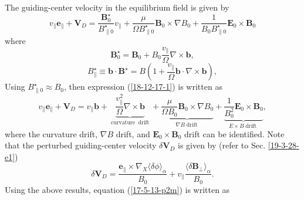 \documentclass{article}
\newcommand{\tmop}[1]{\ensuremath{\operatorname{#1}}}
\begin{document}
The guiding-center velocity in the equilibrium field is given by
\begin{equation}
  \label{18-12-17-1} v_{\parallel} \mathbf{e}_{\parallel} +\mathbf{V}_D =
  \frac{\mathbf{B}^{\star}_0}{B^{\star}_{\parallel 0}} v_{\parallel} +
  \frac{\mu}{\Omega B^{\star}_{\parallel 0}} \mathbf{B}_0 \times \nabla B_0 +
  \frac{1}{B_0 B^{\star}_{\parallel 0}} \mathbf{E}_0 \times \mathbf{B}_0
\end{equation}
where
\begin{equation}
  \mathbf{B}^{\star}_0 =\mathbf{B}_0 + B_0 \frac{v_{\parallel}}{\Omega} \nabla
  \times \mathbf{b},
\end{equation}
\begin{equation}
  \label{5-15-p8} B^{\star}_{\parallel} \equiv \mathbf{b} \cdot
  \mathbf{B}^{\star} = B \left( 1 + \frac{v_{\parallel}}{\Omega} \mathbf{b}
  \cdot \nabla \times \mathbf{b} \right),
\end{equation}
Using $B_{\parallel 0}^{\star} \approx B_0$, then expression
(\ref{18-12-17-1}) is written as
\begin{equation}
  v_{\parallel} \mathbf{e}_{\parallel} +\mathbf{V}_D = v_{\parallel}
  \mathbf{b}+ \underbrace{\frac{v_{\parallel}^2}{\Omega} \nabla \times
  \mathbf{b}}_{\tmop{curvature} \tmop{drift}} + \underbrace{\frac{\mu}{\Omega
  B_0} \mathbf{B}_0 \times \nabla B_0}_{\nabla B \tmop{drift}} +
  \underbrace{\frac{1}{B_0^2} \mathbf{E}_0 \times \mathbf{B}_0}_{E \times B
  \tmop{drift}},
\end{equation}
where the curvature drift, $\nabla B$ drift, and $\mathbf{E}_0 \times
\mathbf{B}_0$ drift can be identified. Note that the perturbed guiding-center
velocity $\delta \mathbf{V}_D$ is given by (refer to Sec. \ref{19-3-28-e1})
\begin{equation}
  \delta \mathbf{V}_D = \frac{\mathbf{e}_{\parallel} \times \nabla_X \langle
  \delta \phi \rangle_{\alpha}}{B_0} + v_{\parallel} \frac{\langle \delta
  \mathbf{B}_{\perp} \rangle_{\alpha}}{B_0} .
\end{equation}
Using the above results, equation (\ref{17-5-13-p2m}) is written as
\end{document}
